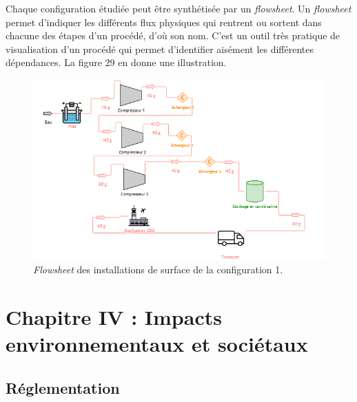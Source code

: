 \documentclass[11pt,french,a4paper]{article}
\begin{document}
Chaque configuration étudiée peut être synthétisée par un \textit{flowsheet}. Un \textit{flowsheet} permet d'indiquer les différents flux physiques qui rentrent ou sortent dans chacune des étapes d'un procédé, d'où son nom. C'est un outil très pratique de visualisation d'un procédé qui permet d'identifier aisément les différentes dépendances. La figure 29 en donne une illustration.

\begin{figure}[!h]
\centering
\includegraphics[width=0.7\linewidth]{image/chap3/figure2_chap2.4.png}
\caption{ \textit{Flowsheet} des installations de surface de la configuration 1.}
\end{figure}






\section{Chapitre IV : Impacts environnementaux et sociétaux}
\subsection{Réglementation}
\end{document}
